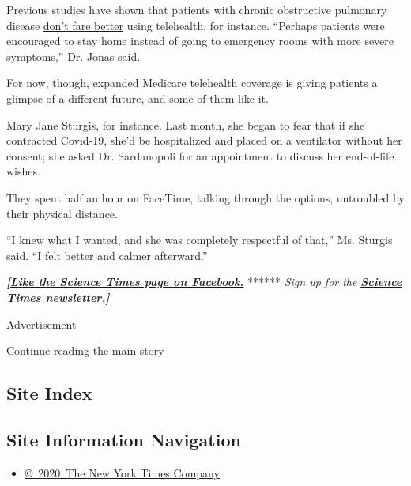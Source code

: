 Previous studies have shown that patients with chronic obstructive
pulmonary disease \href{https://bjgp.org/content/62/604/e739}{don't fare
better} using telehealth, for instance. ``Perhaps patients were
encouraged to stay home instead of going to emergency rooms with more
severe symptoms,'' Dr. Jonas said.

For now, though, expanded Medicare telehealth coverage is giving
patients a glimpse of a different future, and some of them like it.

Mary Jane Sturgis, for instance. Last month, she began to fear that if
she contracted Covid-19, she'd be hospitalized and placed on a
ventilator without her consent; she asked Dr. Sardanopoli for an
appointment to discuss her end-of-life wishes.

They spent half an hour on FaceTime, talking through the options,
untroubled by their physical distance.

``I knew what I wanted, and she was completely respectful of that,'' Ms.
Sturgis said. ``I felt better and calmer afterward.''

\textbf{\emph{{[}}\href{http://on.fb.me/1paTQ1h}{\emph{Like the Science
Times page on Facebook.}}} ****** \emph{\textbar{} Sign up for the}
\textbf{\href{http://nyti.ms/1MbHaRU}{\emph{Science Times
newsletter.}}\emph{{]}}}

Advertisement

\protect\hyperlink{after-bottom}{Continue reading the main story}

\hypertarget{site-index}{%
\subsection{Site Index}\label{site-index}}

\hypertarget{site-information-navigation}{%
\subsection{Site Information
Navigation}\label{site-information-navigation}}

\begin{itemize}
\tightlist
\item
  \href{https://help.nytimes3xbfgragh.onion/hc/en-us/articles/115014792127-Copyright-notice}{©~2020~The
  New York Times Company}
\end{itemize}

